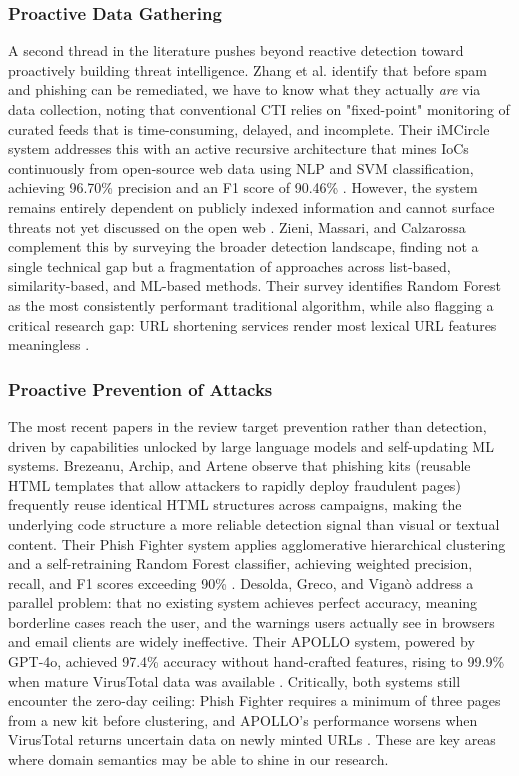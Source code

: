\documentclass[conference]{IEEEtran}
\begin{document}
\subsubsection{Proactive Data Gathering}
A second thread in the literature pushes beyond reactive detection toward proactively building threat intelligence. Zhang et al. \cite{zhang1} identify that before spam and phishing can be remediated, we have to know what they actually \textit{are} via data collection, noting that conventional CTI relies on "fixed-point" monitoring of curated feeds that is time-consuming, delayed, and incomplete. Their iMCircle system addresses this with an active recursive architecture that mines IoCs continuously from open-source web data using NLP and SVM classification, achieving 96.70\% precision and an F1 score of 90.46\% \cite{zhang1}. However, the system remains entirely dependent on publicly indexed information and cannot surface threats not yet discussed on the open web \cite{zhang1}. Zieni, Massari, and Calzarossa \cite{zieni_phishing_2023} complement this by surveying the broader detection landscape, finding not a single technical gap but a fragmentation of approaches across list-based, similarity-based, and ML-based methods. Their survey identifies Random Forest as the most consistently performant traditional algorithm, while also flagging a critical research gap: URL shortening services render most lexical URL features meaningless \cite{zieni_phishing_2023}.

\subsubsection{Proactive Prevention of Attacks}
The most recent papers in the review target prevention rather than detection, driven by capabilities unlocked by large language models and self-updating ML systems. Brezeanu, Archip, and Artene \cite{brezeanu_phish_2025} observe that phishing kits (reusable HTML templates that allow attackers to rapidly deploy fraudulent pages) frequently reuse identical HTML structures across campaigns, making the underlying code structure a more reliable detection signal than visual or textual content. Their Phish Fighter system applies agglomerative hierarchical clustering and a self-retraining Random Forest classifier, achieving weighted precision, recall, and F1 scores exceeding 90\% \cite{brezeanu_phish_2025}. Desolda, Greco, and Viganò \cite{desolda_apollo_2025} address a parallel problem: that no existing system achieves perfect accuracy, meaning borderline cases reach the user, and the warnings users actually see in browsers and email clients are widely ineffective. Their APOLLO system, powered by GPT-4o, achieved 97.4\% accuracy without hand-crafted features, rising to 99.9\% when mature VirusTotal data was available \cite{desolda_apollo_2025}. Critically, both systems still encounter the zero-day ceiling: Phish Fighter requires a minimum of three pages from a new kit before clustering, and APOLLO's performance worsens when VirusTotal returns uncertain data on newly minted URLs \cite{brezeanu_phish_2025, desolda_apollo_2025}. These are key areas where domain semantics may be able to shine in our research.
\end{document}
